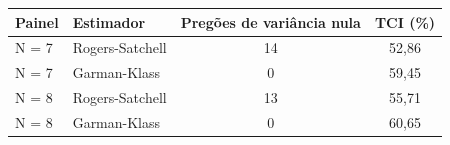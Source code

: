 \begin{tabular}{llcc}
\toprule
Painel & Estimador & Pregões de variância nula & TCI (\%) \\
\midrule
N = 7 & Rogers-Satchell & 14 & 52,86 \\
N = 7 & Garman-Klass & 0 & 59,45 \\
\midrule
N = 8 & Rogers-Satchell & 13 & 55,71 \\
N = 8 & Garman-Klass & 0 & 60,65 \\
\bottomrule
\end{tabular}
